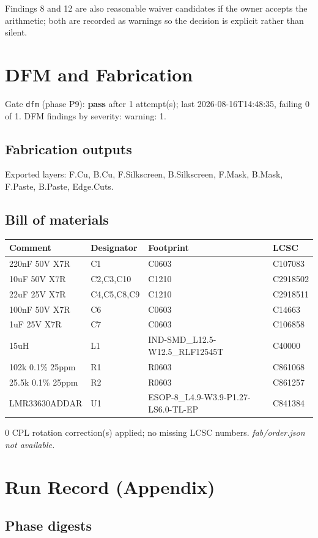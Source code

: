 \documentclass[11pt,a4paper]{article}
\begin{document}
Findings 8 and 12 are also reasonable waiver candidates if the owner accepts the arithmetic; both are recorded as warnings so the decision is explicit rather than silent.

\section{DFM and Fabrication}
Gate \texttt{dfm} (phase P9): \textbf{pass} after 1 attempt(s); last 2026-08-16T14:48:35, failing 0 of 1.
DFM findings by severity: warning: 1.
\subsection*{Fabrication outputs}
Exported layers: F.Cu, B.Cu, F.Silkscreen, B.Silkscreen, F.Mask, B.Mask, F.Paste, B.Paste, Edge.Cuts.
\subsection*{Bill of materials}
{\small
\begin{longtable}{p{4.4cm}p{2.8cm}p{4.6cm}l}
\toprule
\textbf{Comment} & \textbf{Designator} & \textbf{Footprint} & \textbf{LCSC} \\
\midrule
\endhead
220nF 50V X7R & C1 & C0603 & C107083 \\
10uF 50V X7R & C2,C3,C10 & C1210 & C2918502 \\
22uF 25V X7R & C4,C5,C8,C9 & C1210 & C2918511 \\
100nF 50V X7R & C6 & C0603 & C14663 \\
1uF 25V X7R & C7 & C0603 & C106858 \\
15uH & L1 & IND-SMD\_L12.5-W12.5\_RLF12545T & C40000 \\
102k 0.1\% 25ppm & R1 & R0603 & C861068 \\
25.5k 0.1\% 25ppm & R2 & R0603 & C861257 \\
LMR33630ADDAR & U1 & ESOP-8\_L4.9-W3.9-P1.27-LS6.0-TL-EP & C841384 \\
\bottomrule
\end{longtable}
}
0 CPL rotation correction(s) applied; no missing LCSC numbers.
\emph{fab/order.json not available.}
\section{Run Record (Appendix)}
\subsection*{Phase digests}
\end{document}
